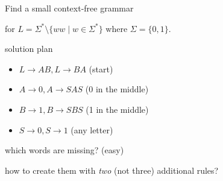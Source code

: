 \begin{slide}{Find a small context-free grammar}

\newcommand{\reverse}{\mathop{\textrm{reverse}}}

for $L = \Sigma^* \setminus \{w w \mid  w \in\Sigma^* \}$
where $\Sigma=\{0,1\}$.

solution plan
\begin{itemize}
\item $L \to AB, L \to BA$ (start)
\item $A \to 0, A \to SAS$ (0 in the middle)
\item $B \to 1, B \to SBS$ (1 in the middle)
\item $S \to 0,S \to 1$ (any letter)
\end{itemize}
which words are missing? (easy)

how to create them with \emph{two} (not three) additional rules?

\end{slide}
